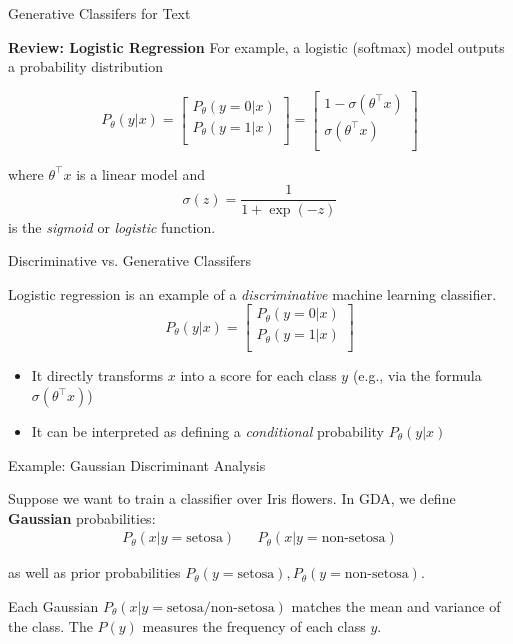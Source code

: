 \documentclass[../../main.tex]{subfiles}
\begin{document}
\begin{frame}[fragile]{Generative Classifers for Text}


\textbf{Review: Logistic Regression
}
For example, a logistic (softmax) model outputs a probability distribution 

$$
P_\theta(y| x) 
= \left[ \begin{array}{c}
P_\theta(y=0| x) \\
P_\theta(y=1| x) \\
\end{array} \right]
= \left[ \begin{array}{c}
1-\sigma(\theta^\top x) \\
\sigma(\theta^\top x) \\
\end{array} \right]
$$

where $\theta^\top x$ is a linear model and
$$\sigma(z) = \frac{1}{1 + \exp(-z)}$$
is the \textit{sigmoid} or \textit{logistic} function.


\end{frame}


\begin{frame}[fragile]{Discriminative vs. Generative Classifers}


Logistic regression is an example of a \textit{discriminative} machine learning classifier.
$$
P_\theta(y| x) 
= \left[ \begin{array}{c}
P_\theta(y=0| x) \\
P_\theta(y=1| x) \\
\end{array} \right]
$$
\begin{itemize}
    \item It directly transforms $x$ into a score for each class $y$ (e.g., via the formula $\sigma(\theta^\top x)$)
    \item It can be interpreted as defining a \textit{conditional} probability $P_\theta(y|x)$
\end{itemize}

\end{frame}





\begin{frame}[fragile]{Example: Gaussian Discriminant Analysis}

Suppose we want to train a classifier over Iris flowers. In GDA, we define \textbf{Gaussian} probabilities:
\begin{align*}
P_\theta(x|y=\text{setosa}) && P_\theta(x|y=\text{non-setosa})
\end{align*}

as well as prior probabilities $P_\theta(y=\text{setosa}), P_\theta(y=\text{non-setosa})$.


\vspace{0.2cm}

Each Gaussian $P_\theta(x|y=\text{setosa/non-setosa})$ matches the mean and variance of the class. The $P(y)$ measures the frequency of each class $y$.

\end{frame}
\end{document}
